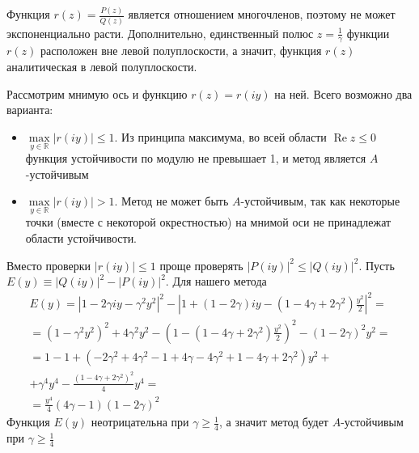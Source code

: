 \documentclass[12pt]{article}
\begin{document}
Функция $r(z) = \frac{P(z)}{Q(z)}$ является отношением многочленов, поэтому не может экспоненциально расти. Дополнительно, единственный полюс $z = \frac{1}{\gamma}$ функции $r(z)$ расположен вне левой полуплоскости, а значит, функция $r(z)$ аналитическая в левой полуплоскости.

Рассмотрим мнимую ось и функцию $r(z) = r(iy)$ на ней. Всего возможно два варианта: \begin{itemize}
	\item $\max\limits_{y \in \mathbb{R}} |r(iy)| \leqslant 1$. Из принципа максимума, во всей области $\operatorname{Re} z \leqslant 0$ функция устойчивости по модулю не превышает 1, и метод является $A$-устойчивым
	\item $\max\limits_{y \in \mathbb{R}} |r(iy)| > 1$. Метод не может быть $A$-устойчивым, так как некоторые точки (вместе с некоторой окрестностью) на мнимой оси не принадлежат области устойчивости.
\end{itemize}

Вместо проверки $|r(iy)| \leqslant 1$ проще проверять $|P(iy)|^2 \leqslant |Q(iy)|^2$. Пусть $E(y) \equiv |Q(iy)|^2-|P(iy)|^2$. Для нашего метода
\begin{multline*}
E(y) = |1 -2\gamma iy - \gamma^2 y^2|^2 - \left|1 + (1-2\gamma)iy-(1-4\gamma+2\gamma^2) \frac{y^2}{2}\right|^2 = \\ =
(1 - \gamma^2 y^2)^2 + 4 \gamma^2 y^2 - \left(1 -(1-4\gamma+2\gamma^2) \frac{y^2}{2}\right)^2 - (1 - 2 \gamma)^2 y^2 = \\ = 1 - 1 + (-2\gamma^2 + 4\gamma^2 - 1 + 4\gamma - 4 \gamma^2 + 1 -4\gamma + 2\gamma^2)y^2 + \\ +
\gamma^4 y^4 - \frac{(1 - 4\gamma + 2\gamma^2)^2}{4}y^4 = \\ =
\frac{y^4}{4}(4\gamma - 1)(1-2\gamma)^2
\end{multline*}
Функция $E(y)$ неотрицательна при $\gamma \geqslant \frac{1}{4}$, а значит метод будет $A$-устойчивым при $\gamma \geqslant \frac{1}{4}$
\end{document}
